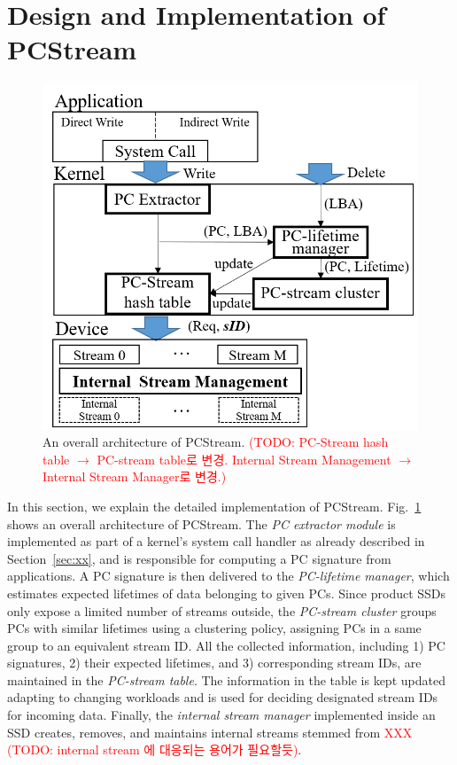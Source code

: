 \section{Design and Implementation of \textsf{PCStream}}

\begin{figure}[t]
	\centering
	\includegraphics[width=0.8\linewidth]{figure/overview.png}
	\caption{
		An overall architecture of \textsf{\small PCStream}. 
		\textcolor{red}{(TODO: PC-Stream hash table $\rightarrow$ PC-stream table로 변경.
			Internal Stream Management $\rightarrow$ Internal Stream Manager로 변경.)}
	}
	\label{fig:architecture}
\end{figure}


In this section, we explain the detailed implementation of \textsf{\small
PCStream}.  Fig.~\ref{fig:architecture} shows an overall architecture of
\textsf{\small PCStream}. The \textit{PC extractor module} is implemented as
part of a kernel's system call handler as already described in
Section~\ref{sec:xx}, and is responsible for computing a PC signature
from applications.  A PC signature is then delivered to the \textit{PC-lifetime
manager}, which estimates expected lifetimes of data belonging to given PCs.
Since product SSDs only expose a limited number of streams outside, the
\textit{PC-stream cluster} groups PCs with similar lifetimes using a clustering
policy, assigning PCs in a same group to an equivalent stream ID.  All the
collected information, including 1) PC signatures, 2) their expected lifetimes, and 3)
corresponding stream IDs, are maintained in the \textit{PC-stream table}.  The
information in the table is kept updated adapting to changing workloads and is
used for deciding designated stream IDs for incoming data. Finally, the
\textit{internal stream manager} implemented inside an SSD creates, removes,
and maintains internal streams stemmed from \textcolor{red}{XXX (TODO: internal stream
에 대응되는 용어가 필요할듯)}.

